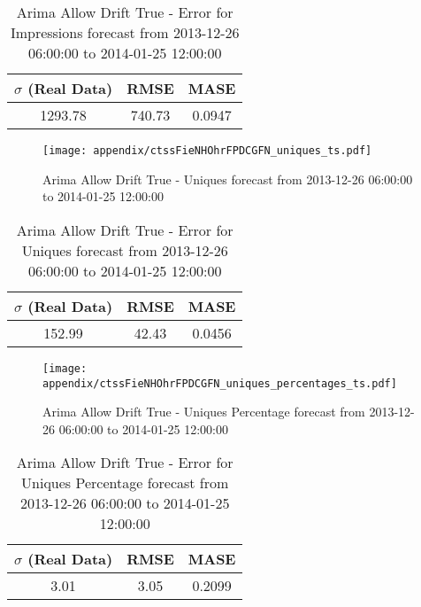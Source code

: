 \begin{table}[H]
\centering
\footnotesize
\begin{tabular}{ccc}
$\sigma$ (Real Data) & RMSE & MASE   \\ \hline
1293.78 & 740.73 & 0.0947 \\
\end{tabular}

\vspace{0.5cm}

\caption[]{
Arima Allow Drift True - Error for Impressions forecast from 2013-12-26 06:00:00 to 2014-01-25 12:00:00}
\end{table}

\begin{figure}[H] \begin{center} \leavevmode
\texttt{[image: appendix/ctssFieNHOhrFPDCGFN\_uniques\_ts.pdf]} \caption[]{
Arima Allow Drift True - Uniques forecast from 2013-12-26 06:00:00 to 2014-01-25 12:00:00} \label{fig:appendix/ctssFieNHOhrFPDCGFN_uniques_ts.pdf} \end{center}
\end{figure}

\begin{table}[H]
\centering
\footnotesize
\begin{tabular}{ccc}
$\sigma$ (Real Data) & RMSE & MASE   \\ \hline
152.99 & 42.43 & 0.0456 \\
\end{tabular}

\vspace{0.5cm}

\caption[]{
Arima Allow Drift True - Error for Uniques forecast from 2013-12-26 06:00:00 to 2014-01-25 12:00:00}
\end{table}

\begin{figure}[H] \begin{center} \leavevmode
\texttt{[image: appendix/ctssFieNHOhrFPDCGFN\_uniques\_percentages\_ts.pdf]} \caption[]{
Arima Allow Drift True - Uniques Percentage forecast from 2013-12-26 06:00:00 to 2014-01-25 12:00:00} \label{fig:appendix/ctssFieNHOhrFPDCGFN_uniques_percentages_ts.pdf} \end{center}
\end{figure}

\begin{table}[H]
\centering
\footnotesize
\begin{tabular}{ccc}
$\sigma$ (Real Data) & RMSE & MASE   \\ \hline
3.01 & 3.05 & 0.2099 \\
\end{tabular}

\vspace{0.5cm}

\caption[]{
Arima Allow Drift True - Error for Uniques Percentage forecast from 2013-12-26 06:00:00 to 2014-01-25 12:00:00}
\end{table}


